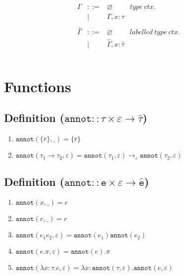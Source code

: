 \documentclass{llncs}
\newcommand{\keywadj}[1]{\mathtt{#1}}
\newcommand{\kwa}[1]{\keywadj{ #1 }}
\begin{document}
\[\begin{array}{lll}
\begin{array}{lllr}
\Gamma & ::= & \varnothing & type~ctx. \\
				& | & \Gamma, x: \tau \\
				&&\\
				
\hat \Gamma & ::= & \varnothing & labelled~type~ctx.\\
				& | & \hat \Gamma, x: \hat \tau \\
				&&\\

\end{array}

\end{array}
\]

\section{Functions}

\subsection*{Definition ($\kwa{annot :: \tau \times \varepsilon \rightarrow \hat \tau}$)}

\begin{enumerate}
	\item $\kwa{annot}(\{ \bar r \}, \_) = \{ \bar r \}$
	\item $\kwa{annot}(\tau_1 \rightarrow \tau_2, \varepsilon) = \kwa{annot}(\tau_1, \varepsilon) \rightarrow_{\varepsilon} \kwa{annot}(\tau_2, \varepsilon)$
\end{enumerate}


\subsection*{Definition ($\kwa{annot :: e \times \varepsilon \rightarrow \hat e}$)}

\begin{enumerate}
	\item $\kwa{annot}(x, \_) = e$
	\item $\kwa{annot}(r, \_) = r$
	\item $\kwa{annot}(e_1 e_2, \varepsilon) = \kwa{annot}(e_1) \kwa{annot}(e_2)$
	\item $\kwa{annot}(e.\pi, \varepsilon) = \kwa{annot}(e).\pi$
	\item $\kwa{annot}(\lambda x: \tau.e, \varepsilon) = \lambda x: \kwa{annot}(\tau, \varepsilon) . \kwa{annot}(e, \varepsilon)$
\end{enumerate}
\end{document}
